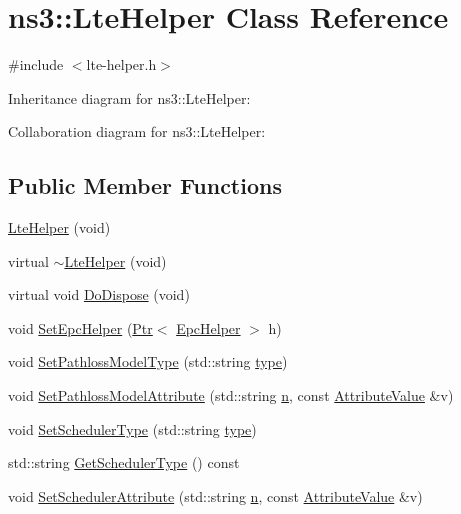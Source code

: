\hypertarget{classns3_1_1LteHelper}{}\section{ns3\+:\+:Lte\+Helper Class Reference}
\label{classns3_1_1LteHelper}


{\ttfamily \#include $<$lte-\/helper.\+h$>$}



Inheritance diagram for ns3\+:\+:Lte\+Helper\+:


Collaboration diagram for ns3\+:\+:Lte\+Helper\+:
\subsection*{Public Member Functions}
\begin{DoxyCompactItemize}
\item 
\hyperlink{classns3_1_1LteHelper_ae74415a950dd03cd60e37faf5d5210b8}{Lte\+Helper} (void)
\item 
virtual \hyperlink{classns3_1_1LteHelper_aeacb1c4fc561490711214da65b14632f}{$\sim$\+Lte\+Helper} (void)
\item 
virtual void \hyperlink{classns3_1_1LteHelper_ad3c0d6eccfdd3af26fc1e9fce5b3ec61}{Do\+Dispose} (void)
\item 
void \hyperlink{classns3_1_1LteHelper_a324079a1ccd54ce949786b83d6b95915}{Set\+Epc\+Helper} (\hyperlink{classns3_1_1Ptr}{Ptr}$<$ \hyperlink{classns3_1_1EpcHelper}{Epc\+Helper} $>$ h)
\item 
void \hyperlink{classns3_1_1LteHelper_afc1acbe82dd719d319e7d79b50e99ba7}{Set\+Pathloss\+Model\+Type} (std\+::string \hyperlink{visualizer-ideas_8txt_add98db9e15e2a58cf2b57623e7aa893a}{type})
\item 
void \hyperlink{classns3_1_1LteHelper_aa96ebbd6845ca61c2b5e08e84481a348}{Set\+Pathloss\+Model\+Attribute} (std\+::string \hyperlink{lte__link__budget__x2__handover__measures_8m_abdb05bc5a064cf642a06c83b3392f148}{n}, const \hyperlink{classns3_1_1AttributeValue}{Attribute\+Value} \&v)
\item 
void \hyperlink{classns3_1_1LteHelper_a8f86e55b8b80a81732c4b2df00fb25d5}{Set\+Scheduler\+Type} (std\+::string \hyperlink{visualizer-ideas_8txt_add98db9e15e2a58cf2b57623e7aa893a}{type})
\item 
std\+::string \hyperlink{classns3_1_1LteHelper_a473e6182ffe9f7b174aa3f149bd5e205}{Get\+Scheduler\+Type} () const 
\item 
void \hyperlink{classns3_1_1LteHelper_a38f8c7f4592b31c0f3dedb53e7909742}{Set\+Scheduler\+Attribute} (std\+::string \hyperlink{lte__link__budget__x2__handover__measures_8m_abdb05bc5a064cf642a06c83b3392f148}{n}, const \hyperlink{classns3_1_1AttributeValue}{Attribute\+Value} \&v)

\end{DoxyCompactItemize}
